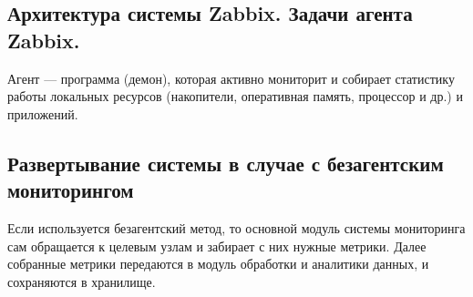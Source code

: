 \subsection{Архитектура системы Zabbix. Задачи агента Zabbix.}
Агент — программа (демон), которая активно мониторит и собирает
статистику работы локальных ресурсов (накопители, оперативная память,
процессор и др.) и приложений.

\subsection{Развертывание системы в случае с безагентским мониторингом}
Если используется безагентский
метод, то основной модуль системы мониторинга сам обращается к целевым
узлам и забирает с них нужные метрики.
Далее собранные метрики
передаются в модуль обработки и аналитики данных, и сохраняются в
хранилище.
